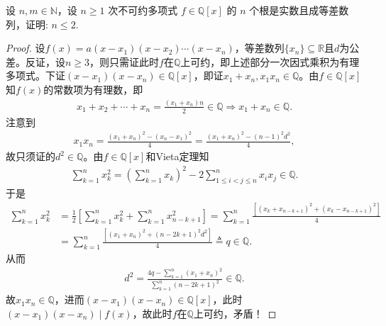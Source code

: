 \documentclass[../../main.tex]{subfiles}%
\begin{document}
\begin{example}
设 \( n,m \in \mathbb{N} \)，设 \( n \geqslant 1 \) 次不可约多项式 \( f \in \mathbb{Q}[x] \) 的 \( n \) 个根是实数且成等差数列，证明: \( n \leqslant 2 \).
\end{example}
\begin{proof}
设$f(x)=a(x-x_1)(x-x_2)\cdots(x-x_n)$，等差数列$\{x_n\}\subseteq\mathbb{R}$且$d$为公差。反证，设$n\geqslant 3$，则只需证此时$f$在$\mathbb{Q}$上可约，即上述部分一次因式乘积为有理多项式。下证$(x-x_1)(x-x_n)\in\mathbb{Q}[x]$，即证$x_1+x_n,x_1x_n\in\mathbb{Q}$。由$f\in\mathbb{Q}[x]$知$f(x)$的常数项为有理数，即
\begin{align*}
x_1+x_2+\cdots+x_n=\frac{(x_1+x_n)n}{2}\in\mathbb{Q}\Longrightarrow x_1+x_n\in\mathbb{Q}.
\end{align*}
注意到
\begin{align*}
x_1x_n=\frac{(x_1+x_n)^2-(x_n-x_1)^2}{4}=\frac{(x_1+x_n)^2-(n-1)^2d^2}{4},
\end{align*}
故只须证的$d^2\in\mathbb{Q}$。由$f\in\mathbb{Q}[x]$和Vieta定理知
\begin{align*}
\sum_{k=1}^n x_k^2=\left(\sum_{k=1}^n x_k\right)^2-2\sum_{1\leqslant i<j\leqslant n}^n x_ix_j\in\mathbb{Q}.
\end{align*}
于是
\begin{align*}
\sum_{k=1}^n x_k^2&=\frac{1}{2}\left[\sum_{k=1}^n x_k^2+\sum_{k=1}^n x_{n-k+1}^2\right]=\sum_{k=1}^n \frac{\left[(x_k+x_{n-k+1})^2+(x_k-x_{n-k+1})^2\right]}{4}\\
&=\sum_{k=1}^n \frac{\left[(x_1+x_n)^2+(n-2k+1)^2d^2\right]}{4}\triangleq q\in\mathbb{Q}.
\end{align*}
从而
\begin{align*}
d^2=\frac{4q-\sum\limits_{k=1}^n (x_1+x_n)^2}{\sum\limits_{k=1}^n (n-2k+1)^2}\in\mathbb{Q}.
\end{align*}
故$x_1x_n\in\mathbb{Q}$，进而$(x-x_1)(x-x_n)\in\mathbb{Q}[x]$，此时$(x-x_1)(x-x_n)\mid f(x)$，故此时$f$在$\mathbb{Q}$上可约，矛盾！
\end{proof}
\end{document}

